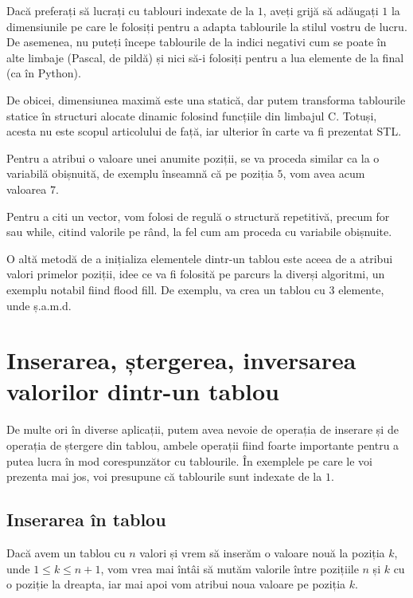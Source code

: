 \begin{observation}
Dacă preferați să lucrați cu tablouri indexate de la $1$, aveți grijă să adăugați $1$ la dimensiunile pe care le folosiți pentru a adapta tablourile la stilul vostru de lucru. De asemenea, nu puteți începe tablourile de la indici negativi cum se poate în alte limbaje (Pascal, de pildă) și nici să-i folosiți pentru a lua elemente de la final (ca în Python).
\end{observation}

\begin{observation}
De obicei, dimensiunea maximă este una statică, dar putem transforma tablourile statice în structuri alocate dinamic folosind funcțiile din limbajul C. Totuși, acesta nu este scopul articolului de față, iar ulterior în carte va fi prezentat STL. 
\end{observation}

Pentru a atribui o valoare unei anumite poziții, se va proceda similar ca la o variabilă obișnuită, de exemplu  înseamnă că pe poziția $5$, vom avea acum valoarea $7$.

Pentru a citi un vector, vom folosi de regulă o structură repetitivă, precum for sau while, citind valorile pe rând, la fel cum am proceda cu variabile obișnuite.

O altă metodă de a inițializa elementele dintr-un tablou este aceea de a atribui valori primelor poziții, idee ce va fi folosită pe parcurs la diverși algoritmi, un exemplu notabil fiind flood fill. De exemplu,  va crea un tablou cu $3$ elemente, unde  ș.a.m.d.

\section{Inserarea, ștergerea, inversarea valorilor dintr-un tablou}

De multe ori în diverse aplicații, putem avea nevoie de operația de inserare și de operația de ștergere din tablou, ambele operații fiind foarte importante pentru a putea lucra în mod corespunzător cu tablourile. În exemplele pe care le voi prezenta mai jos, voi presupune că tablourile sunt indexate de la $1$.

\subsection{Inserarea în tablou}

Dacă avem un tablou cu $n$ valori și vrem să inserăm o valoare nouă la poziția $k$, unde $1 \leq k \leq n+1$, vom vrea mai întâi să mutăm valorile între pozițiile $n$ și $k$ cu o poziție la dreapta, iar mai apoi vom atribui noua valoare pe poziția $k$.  

